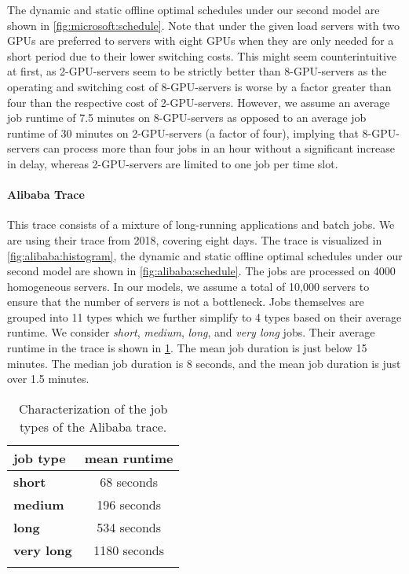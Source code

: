 The dynamic and static offline optimal schedules under our second model are shown in \cref{fig:microsoft:schedule}. Note that under the given load servers with two GPUs are preferred to servers with eight GPUs when they are only needed for a short period due to their lower switching costs. This might seem counterintuitive at first, as 2-GPU-servers seem to be strictly better than 8-GPU-servers as the operating and switching cost of 8-GPU-servers is worse by a factor greater than four than the respective cost of 2-GPU-servers. However, we assume an average job runtime of 7.5 minutes on 8-GPU-servers as opposed to an average job runtime of 30 minutes on 2-GPU-servers (a factor of four), implying that 8-GPU-servers can process more than four jobs in an hour without a significant increase in delay, whereas 2-GPU-servers are limited to one job per time slot.

\paragraph{Alibaba Trace~\cite{Alibaba2018}} This trace consists of a mixture of long-running applications and batch jobs. We are using their trace from 2018, covering eight days. The trace is visualized in \cref{fig:alibaba:histogram}, the dynamic and static offline optimal schedules under our second model are shown in \cref{fig:alibaba:schedule}. The jobs are processed on 4000 homogeneous servers. In our models, we assume a total of 10,000 servers to ensure that the number of servers is not a bottleneck. Jobs themselves are grouped into 11 types which we further simplify to 4 types based on their average runtime. We consider \emph{short}, \emph{medium}, \emph{long}, and \emph{very long} jobs. Their average runtime in the trace is shown in \cref{tab:alibaba:job_types}. The mean job duration is just below 15 minutes. The median job duration is 8 seconds, and the mean job duration is just over 1.5 minutes.

\begin{table}
    \centering
    \begin{tabularx}{\textwidth}{>{\bfseries}l|c}
        job type & mean runtime \\\hline
        short & 68 seconds \\
        medium & 196 seconds \\
        long & 534 seconds \\
        very long & 1180 seconds \\
    \caption{Characterization of the job types of the Alibaba trace.}
    \end{tabularx}
    \label{tab:alibaba:job_types}
\end{table}

